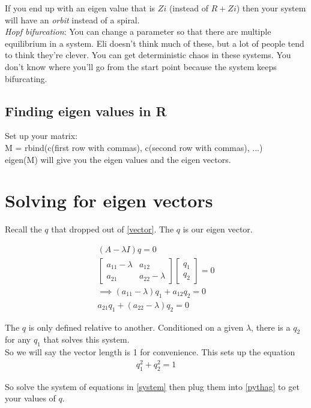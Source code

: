 \documentclass{article}
\begin{document}
If you end up with an eigen value that is $Zi$ (instead of $R + Zi$) then your system will have an \textit{orbit} instead of a spiral. \\

\textit{Hopf bifurcation}: You can change a parameter so that there are multiple equilibrium in a system. Eli doesn't think much of these, but a lot of people tend to think they're clever. You can get deterministic chaos in these systems. You don't know where you'll go from the start point because the system keeps bifurcating.  

\subsection{Finding eigen values in R}
Set up your matrix: \\
M = rbind(c(first row with commas), c(second row with commas), ...) \\
eigen(M)  will give you the eigen values and the eigen vectors. 

\section{Solving for eigen vectors}
Recall the $q$ that dropped out of \ref{vector}.  The $q$ is our eigen vector. 

\begin{align}
    (A - \lambda I ) q = 0 \\
    \begin{bmatrix}
        a_{11} - \lambda & a_{12} \\
        a_{21} & a_{22} - \lambda
    \end{bmatrix}
    \begin{bmatrix}
        q_1 \\
        q_2
    \end{bmatrix} = 0 \\
    \implies (a_{11} - \lambda) q_1 + a_{12} q_2 = 0 \label{system} \\
    a_{21} q_1 + (a_{22} - \lambda) q_2 = 0 
\end{align}

The $q$ is only defined relative to another. Conditioned on a given $\lambda$, there is a $q_2$ for any $q_1$ that solves this system. \\

So we will say the vector length is 1 for convenience. This sets up the equation 
\begin{align}
    q_1^2 + q_2^2 = 1 \label{pythag}
\end{align}

So solve the system of equations in \ref{system} then plug them into \ref{pythag} to get your values of $q$. 
\end{document}
